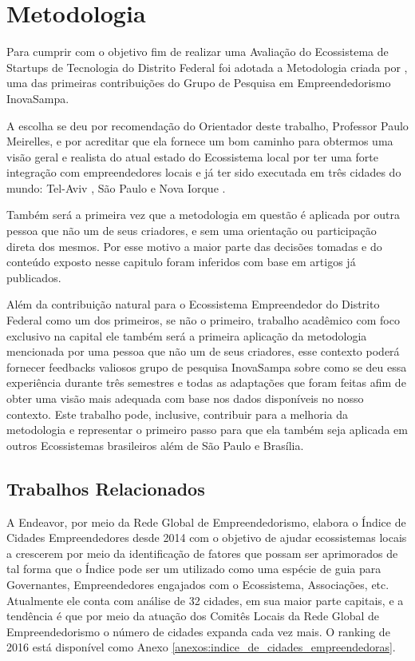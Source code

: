 \chapter[Metodologia]{Metodologia}
\label{cap-metodologia}

Para cumprir com o objetivo fim de realizar uma Avaliação do Ecossistema de Startups de Tecnologia do Distrito Federal foi adotada a Metodologia criada por , uma das primeiras contribuições do Grupo de Pesquisa em Empreendedorismo InovaSampa. 

A escolha se deu por recomendação do Orientador deste trabalho, Professor Paulo Meirelles, e por acreditar que ela fornece um bom caminho para obtermos uma visão geral e realista do atual estado do Ecossistema local por ter uma forte integração com empreendedores locais e já ter sido executada em três cidades do mundo: Tel-Aviv , São Paulo  e Nova Iorque . 

Também será a primeira vez que a metodologia em questão é aplicada por outra pessoa que não um de seus criadores, e sem uma orientação ou participação direta dos mesmos. Por esse motivo a maior parte das decisões tomadas e do conteúdo exposto nesse capitulo foram inferidos com base em artigos já publicados. 

Além da contribuição natural para o Ecossistema Empreendedor do Distrito Federal como um dos primeiros, se não o primeiro, trabalho acadêmico com foco exclusivo na capital ele também será a primeira aplicação da metodologia mencionada por uma pessoa que não um de seus criadores, esse contexto poderá fornecer feedbacks valiosos grupo de pesquisa InovaSampa sobre como se deu essa experiência durante três semestres e todas as adaptações que foram feitas afim de obter uma visão mais adequada com base nos dados disponíveis no nosso contexto. Este trabalho pode, inclusive, contribuir para a melhoria da metodologia e representar o primeiro passo para que ela também seja aplicada em outros Ecossistemas brasileiros além de São Paulo e Brasília.

\section{Trabalhos Relacionados}
\label{section:trabalhos_relacionados}

A Endeavor, por meio da Rede Global de Empreendedorismo, elabora o Índice de Cidades Empreendedores desde 2014 com o objetivo de ajudar ecossistemas locais a crescerem por meio da identificação de fatores que possam ser aprimorados de tal forma que o Índice pode ser um utilizado como uma espécie de guia para Governantes, Empreendedores engajados com o Ecossistema, Associações, etc. Atualmente ele conta com análise de 32 cidades, em sua maior parte capitais, e a tendência é que por meio da atuação dos Comitês Locais da Rede Global de Empreendedorismo o número de cidades expanda cada vez mais. O ranking de 2016 está disponível como Anexo \ref{anexos:indice_de_cidades_empreendedoras}.

